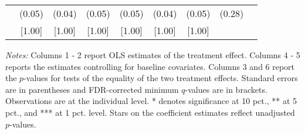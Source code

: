 \begin{table}[htbp]
{\begin{threeparttable}
\begin{tabular}{l*{8}{c}}
          &   (0.05)&   (0.04)&   (0.05)&   (0.05)&   (0.04)&   (0.05)&   (0.28)&         \\
          &   [1.00]&   [1.00]&   [1.00]&   [1.00]&   [1.00]&   [1.00]&         &         \\
\bottomrule \end{tabular} \begin{tablenotes}[flushleft] \footnotesize \item \emph{Notes:} Columns 1 - 2 report OLS estimates of the treatment effect. Columns 4 - 5 reports the estimates controlling for baseline covariates. Columns 3 and 6 report the \(p\)-values for tests of the equality of the two treatment effects. Standard errors are in parentheses and FDR-corrected minimum \(q\)-values are in brackets. Observations are at the individual level. * denotes significance at 10 pct., ** at 5 pct., and *** at 1 pct. level. Stars on the coefficient estimates reflect unadjusted \(p\)-values. \end{tablenotes} \end{threeparttable} } \end{table}

